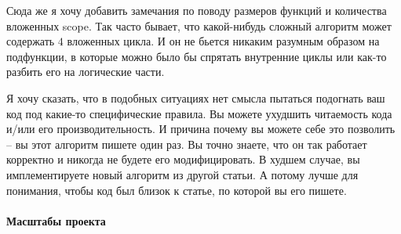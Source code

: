 Сюда же я хочу добавить замечания по поводу размеров функций и количества вложенных scope.
Так часто бывает, что какой-нибудь сложный алгоритм может содержать $4$ вложенных цикла.
И он не бьется никаким разумным образом на подфункции, в которые можно было бы спрятать внутренние циклы или как-то разбить его на логические части.

Я хочу сказать, что в подобных ситуациях нет смысла пытаться подогнать ваш код под какие-то специфические правила.
Вы можете ухудшить читаемость кода и/или его производительность.
И причина почему вы можете себе это позволить -- вы этот алгоритм пишете один раз.
Вы точно знаете, что он так работает корректно и никогда не будете его модифицировать.
В худшем случае, вы имплементируете новый алгоритм из другой статьи.
А потому лучше для понимания, чтобы код был близок к статье, по которой вы его пишете.

\paragraph{Масштабы проекта}

